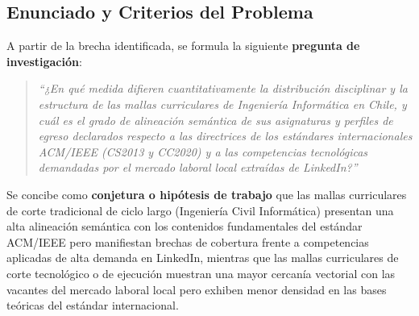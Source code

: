 \subsection{Enunciado y Criterios del Problema}
\label{sec:problem_statement}

A partir de la brecha identificada, se formula la siguiente \textbf{pregunta de investigación}:
\begin{quote}
	\textit{“¿En qué medida difieren cuantitativamente la distribución disciplinar y la estructura de las mallas curriculares de Ingeniería Informática en Chile, y cuál es el grado de alineación semántica de sus asignaturas y perfiles de egreso declarados respecto a las directrices de los estándares internacionales ACM/IEEE (CS2013 y CC2020) y a las competencias tecnológicas demandadas por el mercado laboral local extraídas de LinkedIn?”}
\end{quote}

Se concibe como \textbf{conjetura o hipótesis de trabajo} que las mallas curriculares de corte tradicional de ciclo largo (Ingeniería Civil Informática) presentan una alta alineación semántica con los contenidos fundamentales del estándar ACM/IEEE pero manifiestan brechas de cobertura frente a competencias aplicadas de alta demanda en LinkedIn, mientras que las mallas curriculares de corte tecnológico o de ejecución muestran una mayor cercanía vectorial con las vacantes del mercado laboral local pero exhiben menor densidad en las bases teóricas del estándar internacional.

